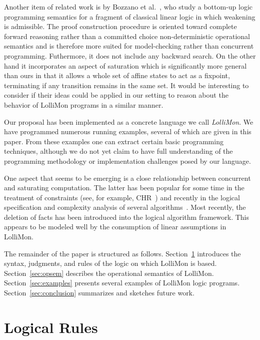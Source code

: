 \documentclass{sig-alt}
\begin{document}
Another item of related work is by Bozzano et al.~\cite{Bozzano04tplp},
who study a bottom-up logic programming semantics for a fragment of
classical linear logic in which weakening is admissible.  The proof
construction procedure is oriented toward complete forward reasoning
rather than a committed choice non-deterministic operational semantics
and is therefore more suited for model-checking rather than concurrent
programming.  Futhermore, it does not include any backward search.  On
the other hand it incorporates an aspect of saturation which is
significantly more general than ours in that it allows a whole set of
affine states to act as a fixpoint, terminating if any transition
remains in the same set.  It would be interesting to consider if their
ideas could be applied in our setting to reason about the behavior of
LolliMon programs in a similar manner.
        
Our proposal has been implemented as a concrete language we call
\emph{LolliMon}.  We have programmed numerous running examples,
several of which are given in this paper.  From these examples one can
extract certain basic programming techniques, although we do not yet
claim to have full understanding of the programming methodology or
implementation challenges posed by our language.

One aspect that seems to be emerging is a close relationship between
concurrent and saturating computation.  The latter has been popular
for some time in the treatment of constraints (see, for example,
CHR~\cite{Fruehwirth98jlp}) and recently in the logical specification
and complexity analysis of several
algorithms~\cite{Ganzinger01ijcar,Mcallester02jacm}.  Most recently,
the deletion of facts has been introduced into the logical algorithm
framework. This appears to be modeled well by the consumption of
linear assumptions in LolliMon.

The remainder of the paper is structured as follows.
Section~\ref{sec:logical-rules} introduces the syntax, judgments, and
  rules of the logic on which LolliMon is based.
Section~\ref{sec:opsem} describes the operational semantics of LolliMon.
Section~\ref{sec:examples} presents several examples of LolliMon logic
  programs.
Section~\ref{sec:conclusion} summarizes and sketches future work.

\section{Logical Rules}
\label{sec:logical-rules}
\end{document}
